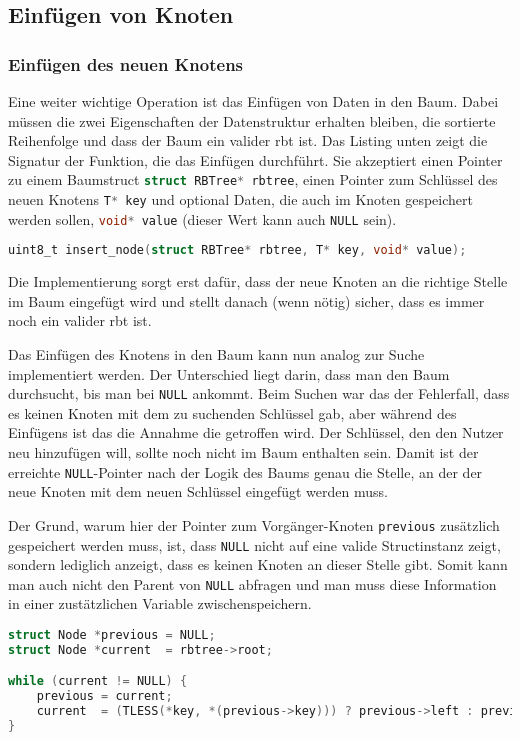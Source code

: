 \documentclass[11pt]{article}
\newcommand{\lstin}[1]{\lstinline[language=C]{#1}}
\begin{document}
\subsection{Einfügen von Knoten}

\subsubsection{Einfügen des neuen Knotens}
Eine weiter wichtige Operation ist das Einfügen von Daten in den Baum. Dabei müssen die zwei Eigenschaften der Datenstruktur erhalten bleiben, die sortierte Reihenfolge und dass der Baum ein valider \gls{rbt} ist.
Das Listing unten zeigt die Signatur der Funktion, die das Einfügen durchführt. Sie akzeptiert einen Pointer zu einem Baumstruct \lstin{struct RBTree* rbtree}, einen Pointer zum Schlüssel des neuen Knotens \lstin{T* key} und optional Daten, die auch im Knoten gespeichert werden sollen, \lstin{void* value} (dieser Wert kann auch \lstin{NULL} sein). 

\begin{lstlisting}[language=C]
uint8_t insert_node(struct RBTree* rbtree, T* key, void* value);
\end{lstlisting}

Die Implementierung sorgt erst dafür, dass der neue Knoten an die richtige Stelle im Baum eingefügt wird und stellt danach (wenn nötig) sicher, dass es immer noch ein valider \gls{rbt} ist.

Das Einfügen des Knotens in den Baum kann nun analog zur Suche implementiert werden. 
Der Unterschied liegt darin, dass man den Baum durchsucht, bis man bei \lstin{NULL} ankommt.
Beim Suchen war das der Fehlerfall, dass es keinen Knoten mit dem zu suchenden Schlüssel gab, aber während des Einfügens ist das die Annahme die getroffen wird. 
Der Schlüssel, den den Nutzer neu hinzufügen will, sollte noch nicht im Baum enthalten sein. Damit ist der erreichte \lstin{NULL}-Pointer nach der Logik des Baums genau die Stelle, an der der neue Knoten mit dem neuen Schlüssel eingefügt werden muss.

Der Grund, warum hier der Pointer zum Vorgänger-Knoten \lstin{previous} zusätzlich gespeichert werden muss, ist, 
dass \lstin{NULL} nicht auf eine valide Structinstanz zeigt, sondern lediglich anzeigt, dass es keinen Knoten an dieser Stelle gibt. 
Somit kann man auch nicht den Parent von \lstin{NULL} abfragen und man muss diese Information in einer zustätzlichen Variable zwischenspeichern. 

\begin{lstlisting}[language=C]
struct Node *previous = NULL;
struct Node *current  = rbtree->root;

while (current != NULL) {
    previous = current;
    current  = (TLESS(*key, *(previous->key))) ? previous->left : previous->right;
}
\end{lstlisting}
\end{document}
